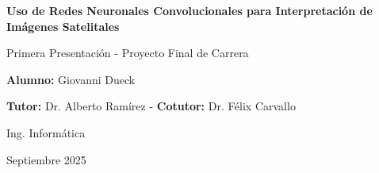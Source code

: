 \documentclass[a4paper, 11pt]{article}
\begin{document}
\begin{center}
    \Large{\bf Uso de Redes Neuronales Convolucionales para Interpretación de Imágenes Satelitales}

    Primera Presentación - Proyecto Final de Carrera

    {
        \small

        {\bf Alumno:} Giovanni Dueck

        {\bf Tutor:} Dr. Alberto Ramírez - {\bf Cotutor:} Dr. Félix Carvallo

        Ing. Informática

        Septiembre 2025
    }
\end{center}

















\printbibliography
\end{document}
